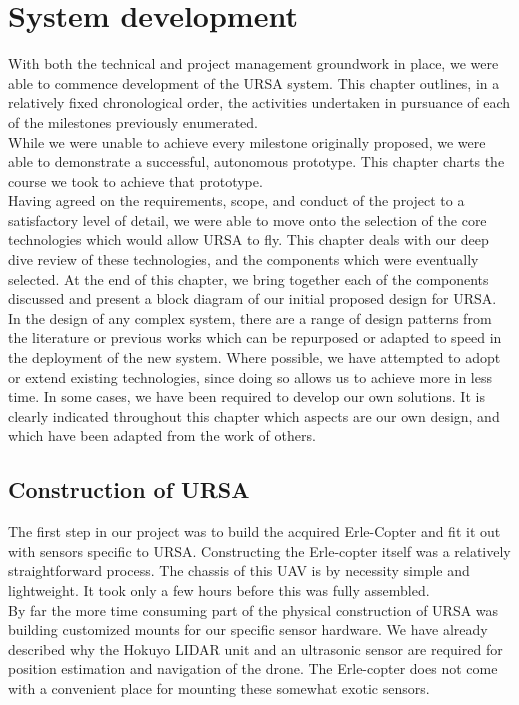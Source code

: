 \documentclass[capstone_report.tex]{subfiles}
\begin{document}
\chapter{System development}
With both the technical and project management groundwork in place, we were able to commence development of the URSA system. This chapter outlines, in a relatively fixed chronological order, the activities undertaken in pursuance of each of the milestones previously enumerated. \\

While we were unable to achieve every milestone originally proposed, we were able to demonstrate a successful, autonomous prototype. This chapter charts the course we took to achieve that prototype.\\


Having agreed on the requirements, scope, and conduct of the project to a satisfactory level of detail, we were able to move onto the selection of the core technologies which would allow URSA to fly. This chapter deals with our deep dive review of these technologies, and the components which were eventually selected. At the end of this chapter, we bring together each of the components discussed and present a block diagram of our initial proposed design for URSA.\\

In the design of any complex system, there are a range of design patterns from the literature or previous works which can be repurposed or adapted to speed in the deployment of the new system. Where possible, we have attempted to adopt or extend existing technologies, since doing so allows us to achieve more in less time. In some cases, we have been required to develop our own solutions. It is clearly indicated throughout this chapter which aspects are our own design, and which have been adapted from the work of others.
\pagebreak

\section{Construction of URSA}
The first step in our project was to build the acquired Erle-Copter and fit it out with sensors specific to URSA. Constructing the Erle-copter itself was a relatively straightforward process. The chassis of this UAV is by necessity simple and lightweight. It took only a few hours before this was fully assembled.\\

By far the more time consuming part of the physical construction of URSA was building customized mounts for our specific sensor hardware. We have already described why the Hokuyo LIDAR unit and an ultrasonic sensor are required for position estimation and navigation of the drone. The Erle-copter does not come with a convenient place for mounting these somewhat exotic sensors.\\
\end{document}
